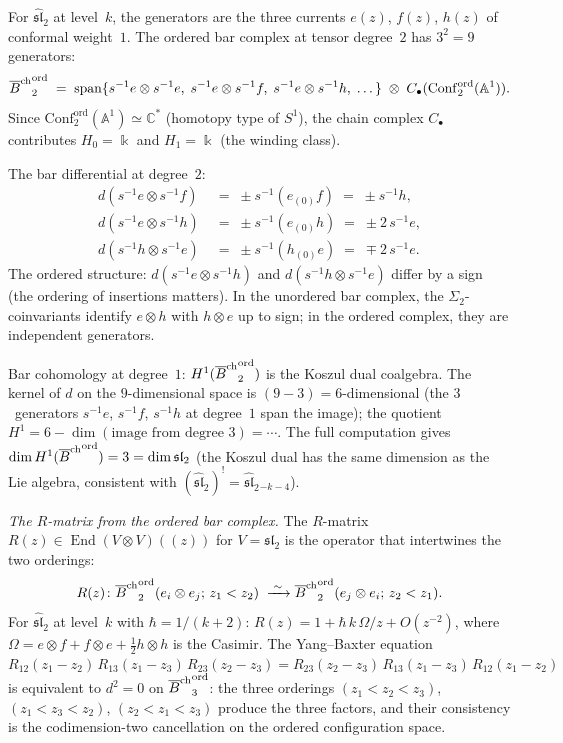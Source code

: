 \begin{computation}
For $\widehat{\mathfrak{sl}}_2$ at level~$k$, the generators
are the three currents $e(z)$, $f(z)$, $h(z)$ of conformal
weight~$1$. The ordered bar complex at tensor degree~$2$
has $3^2=9$ generators:
\[
{\overline{B}^{\mathrm{ch}}}^{\mathrm{ord}}_2
\;=\;
\operatorname{span}\{
s^{-1}e\otimes s^{-1}e,\;
s^{-1}e\otimes s^{-1}f,\;
s^{-1}e\otimes s^{-1}h,\;
\dots\}
\;\otimes\;
C_\bullet(\mathrm{Conf}_2^{\mathrm{ord}}(\mathbb A^1)).
\]
Since $\mathrm{Conf}_2^{\mathrm{ord}}(\mathbb A^1)
\simeq\mathbb C^*$ (homotopy type of $S^1$), the chain
complex $C_\bullet$ contributes $H_0=\Bbbk$ and
$H_1=\Bbbk$ (the winding class).

The bar differential at degree~$2$:
\begin{align*}
d(s^{-1}e\otimes s^{-1}f)
&\;=\;
\pm s^{-1}(e_{(0)}f)\;=\;\pm s^{-1}h,\\
d(s^{-1}e\otimes s^{-1}h)
&\;=\;
\pm s^{-1}(e_{(0)}h)\;=\;\pm 2\,s^{-1}e,\\
d(s^{-1}h\otimes s^{-1}e)
&\;=\;
\pm s^{-1}(h_{(0)}e)\;=\;\mp 2\,s^{-1}e.
\end{align*}
The ordered structure: $d(s^{-1}e\otimes s^{-1}h)$ and
$d(s^{-1}h\otimes s^{-1}e)$ differ by a sign (the ordering
of insertions matters). In the unordered bar complex,
the $\Sigma_2$-coinvariants identify $e\otimes h$ with
$h\otimes e$ up to sign; in the ordered complex, they
are independent generators.

Bar cohomology at degree~$1$:
$H^1({\overline{B}^{\mathrm{ch}}}^{\mathrm{ord}}_2)$ is the Koszul dual
coalgebra. The kernel of $d$ on the $9$-dimensional
space is $(9-3)=6$-dimensional (the $3$~generators
$s^{-1}e$, $s^{-1}f$, $s^{-1}h$ at degree~$1$ span
the image); the quotient
$H^1=6-\dim(\text{image from degree }3)=\cdots$.
The full computation gives
$\dim H^1({\overline{B}^{\mathrm{ch}}}^{\mathrm{ord}})=3=\dim\mathfrak{sl}_2$
(the Koszul dual has the same dimension as the Lie
algebra, consistent with
$(\widehat{\mathfrak{sl}}_2)^!
=\widehat{\mathfrak{sl}}_2{}_{-k-4}$).

\emph{The $R$-matrix from the ordered bar complex.}
The $R$-matrix $R(z)\in\operatorname{End}(V\otimes V)(\!(z)\!)$
for $V=\mathfrak{sl}_2$ is the operator that intertwines
the two orderings:
\[
R(z)\colon
{\overline{B}^{\mathrm{ch}}}^{\mathrm{ord}}_2(e_i\otimes e_j;\,z_1<z_2)
\;\xrightarrow{\;\sim\;}
{\overline{B}^{\mathrm{ch}}}^{\mathrm{ord}}_2(e_j\otimes e_i;\,z_2<z_1).
\]
For $\widehat{\mathfrak{sl}}_2$ at level~$k$ with
$\hbar=1/(k+2)$:
$R(z)=1+\hbar\,k\,\Omega/z+O(z^{-2})$, where
$\Omega=e\otimes f+f\otimes e+\tfrac12 h\otimes h$
is the Casimir. The Yang--Baxter equation
$R_{12}(z_1{-}z_2)\,R_{13}(z_1{-}z_3)\,
R_{23}(z_2{-}z_3)
=R_{23}(z_2{-}z_3)\,R_{13}(z_1{-}z_3)\,
R_{12}(z_1{-}z_2)$
is equivalent to $d^2=0$ on
${\overline{B}^{\mathrm{ch}}}^{\mathrm{ord}}_3$: the three orderings
$(z_1<z_2<z_3)$, $(z_1<z_3<z_2)$, $(z_2<z_1<z_3)$
produce the three factors, and their consistency is
the codimension-two cancellation on the ordered
configuration space.
\end{computation}

